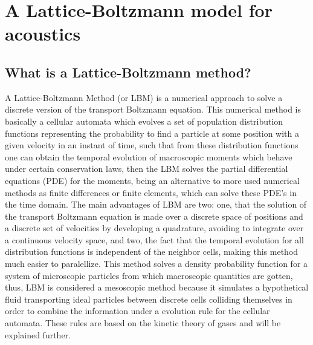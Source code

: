 \chapter{A Lattice-Boltzmann model for acoustics}

\section{What is a Lattice-Boltzmann method?}

A Lattice-Boltzmann Method (or LBM) is a numerical approach to solve a discrete version of the transport Boltzmann equation. This numerical method is basically a cellular automata which evolves a set of population distribution functions representing the probability to find a particle at some position with a given velocity in an instant of time, such that from these distribution functions one can obtain the temporal evolution of macroscopic moments which behave under certain conservation laws, then the LBM solves the partial differential equations (PDE) for the moments, being an alternative to more used numerical methods as finite differences or finite elements, which can solve these PDE's in the time domain. The main advantages of LBM are two: one, that the solution of the transport Boltzmann equation is made over a discrete space of positions and a discrete set of velocities by developing a quadrature, avoiding to integrate over a continuous velocity space, and two, the fact that the temporal evolution for all distribution functions is independent of the neighbor cells, making this method much easier to paralellize. This method solves a density probability function for a system of microscopic particles from which macroscopic quantities are gotten, thus, LBM is considered a mesoscopic method because it simulates a hypothetical fluid transporting ideal particles between discrete cells colliding themselves in order to combine the information under a evolution rule for the cellular automata. These rules are based on the kinetic theory of gases and will be explained further.   


